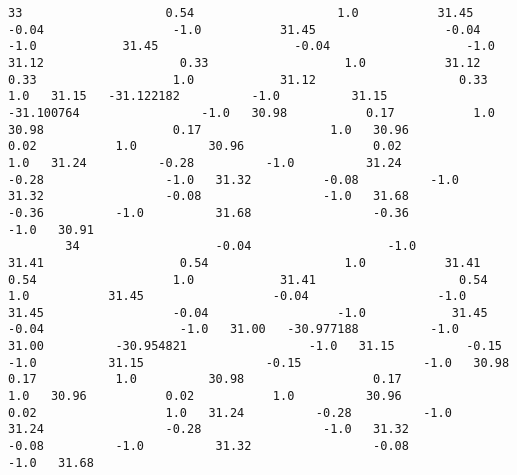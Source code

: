 \documentclass[11pt]{article}
\begin{document}
\begin{Verbatim}[commandchars=\\\{\}]
        33                    0.54                    1.0           31.45                  -0.04                  -1.0           31.45                  -0.04                  -1.0            31.45                   -0.04                   -1.0           31.12                   0.33                   1.0           31.12                   0.33                   1.0            31.12                    0.33                    1.0   31.15   -31.122182          -1.0          31.15          -31.100764                 -1.0   30.98           0.17           1.0          30.98                  0.17                  1.0   30.96           0.02           1.0          30.96                  0.02                  1.0   31.24          -0.28          -1.0          31.24                 -0.28                 -1.0   31.32          -0.08          -1.0          31.32                 -0.08                 -1.0   31.68          -0.36          -1.0          31.68                 -0.36                 -1.0   30.91   
        34                   -0.04                   -1.0           31.41                   0.54                   1.0           31.41                   0.54                   1.0            31.41                    0.54                    1.0           31.45                  -0.04                  -1.0           31.45                  -0.04                  -1.0            31.45                   -0.04                   -1.0   31.00   -30.977188          -1.0          31.00          -30.954821                 -1.0   31.15          -0.15          -1.0          31.15                 -0.15                 -1.0   30.98           0.17           1.0          30.98                  0.17                  1.0   30.96           0.02           1.0          30.96                  0.02                  1.0   31.24          -0.28          -1.0          31.24                 -0.28                 -1.0   31.32          -0.08          -1.0          31.32                 -0.08                 -1.0   31.68   
        

\end{Verbatim}
\end{document}
